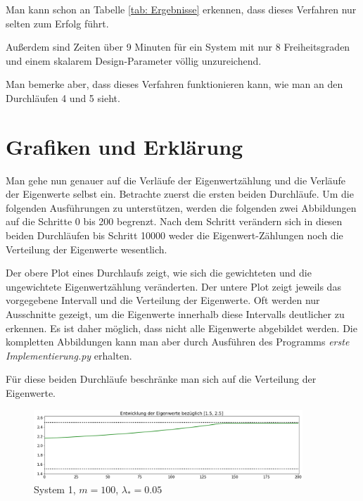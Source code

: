 \documentclass[a4paper,12pt]{report}
\newcommand{\1}{\mathds{1}}
\theoremstyle{plain} %
\theoremstyle{definition} %
\theoremstyle{remark}
\begin{document}
            Man kann schon an Tabelle \ref{tab: Ergebnisse} erkennen, dass dieses Verfahren nur selten zum Erfolg führt.

            Außerdem sind Zeiten über 9 Minuten für ein System mit nur 8 Freiheitsgraden und einem skalarem Design-Parameter völlig unzureichend.

            Man bemerke aber, dass dieses Verfahren funktionieren kann, wie man an den Durchläufen 4 und 5 sieht.

      \section{Grafiken und Erklärung}
            Man gehe nun genauer auf die Verläufe der Eigenwertzählung und die Verläufe der Eigenwerte selbst ein.
            Betrachte zuerst die ersten beiden Durchläufe.
            Um die folgenden Ausführungen zu unterstützen, werden die folgenden zwei Abbildungen auf die Schritte 0 bis 200 begrenzt.
            Nach dem Schritt verändern sich in diesen beiden Durchläufen bis Schritt 10000 weder die Eigenwert-Zählungen noch die Verteilung der Eigenwerte wesentlich.

            Der obere Plot eines Durchlaufs zeigt, wie sich die gewichteten und die ungewichtete Eigenwertzählung veränderten.
            Der untere Plot zeigt jeweils das vorgegebene Intervall und die Verteilung der Eigenwerte.
            Oft werden nur Ausschnitte gezeigt, um die Eigenwerte innerhalb diese Intervalls deutlicher zu erkennen.
            Es ist daher möglich, dass nicht alle Eigenwerte abgebildet werden.
            Die kompletten Abbildungen kann man aber durch Ausführen des Programms \textit{erste Implementierung.py} erhalten.
            
            Für diese beiden Durchläufe beschränke man sich auf die Verteilung der Eigenwerte.
            \begin{figure}[h!t]
                  \centering
                  \includegraphics[width=0.9\textwidth, keepaspectratio]{./Original/Plot_1_100_0.05.png}
                  \caption{System 1, $m=100$, $\lambda_*=0.05$}
                  \label{fig: Plot_1_100_0.05}
            \end{figure}
\end{document}
